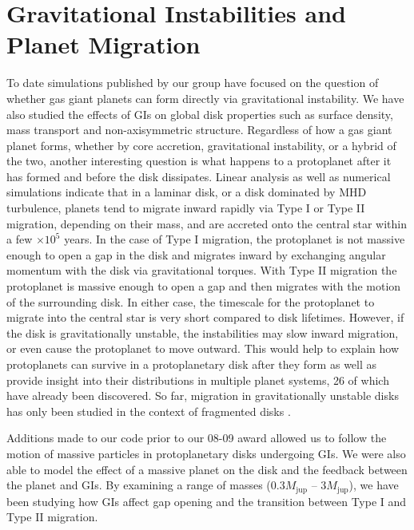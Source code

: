 \documentclass[12pt,preprint2]{aastex}
\begin{document}
\section{Gravitational Instabilities and\\ Planet Migration}
\label{sec:migration}

To date simulations published by our group have focused on the question of whether gas giant planets can form directly
via gravitational instability. We have also studied the effects of GIs on global disk properties such as surface
density, mass transport and non-axisymmetric structure. Regardless of how a gas giant planet forms, whether by core
accretion, gravitational instability, or a hybrid of the two, another interesting question is what happens to a
protoplanet after it has formed and before the disk dissipates.  Linear analysis \citep{ward1997,tanaka2002} as well as
numerical simulations \citep{nelson2003,nelson2004} indicate that in a laminar disk, or a disk dominated by MHD
turbulence, planets tend to migrate inward rapidly via Type I or Type II migration, depending on their mass, and are
accreted onto the central star within a few $\times 10^5$ years. In the case of Type I migration, the protoplanet is not
massive enough to open a gap in the disk and migrates inward by exchanging angular momentum with the disk via
gravitational torques. With Type II migration the protoplanet is massive enough to open a gap and then migrates with the
motion of the surrounding disk. In either case, the timescale for the protoplanet to migrate into the central star is
very short compared to disk lifetimes. However, if the disk is gravitationally unstable, the instabilities may slow
inward migration, or even cause the protoplanet to move outward. This would help to explain how protoplanets can survive
in a protoplanetary disk after they form as well as provide insight into their distributions in multiple planet systems,
26 of which have already been discovered. So far, migration in gravitationally unstable disks has only been studied in
the context of fragmented disks \citep{mayer2004,boss2005}.

Additions made to our code prior to our 08-09 award allowed us to follow the motion of massive particles in
protoplanetary disks undergoing GIs. We were also able to model the effect of a massive planet on the disk and the
feedback between the planet and GIs. By examining a range of masses ($0.3 M_{\mathrm{jup}}$ -- $3 M_{\mathrm{jup}}$), we
have been studying how GIs affect gap opening and the transition between Type I and Type II migration.
\end{document}
